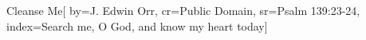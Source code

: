 {Cleanse Me}[
    by={J. Edwin Orr},
    cr={Public Domain},
    sr={Psalm 139:23-24},
    index={Search me, O God, and know my heart today}]
